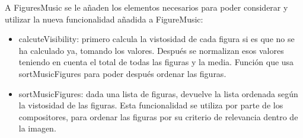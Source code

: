 A FiguresMusic se le añaden los elementos necesarios para poder considerar y utilizar la nueva funcionalidad añadida a FigureMusic:

\begin{itemize}

	\item{calcuteVisibility}: primero calcula la vistosidad de cada figura si es que no se ha calculado ya, tomando los valores. Después se normalizan esos valores teniendo en cuenta el total de todas las figuras y la media. Función que usa sortMusicFigures para poder después ordenar las figuras.

	\item{sortMusicFigures}: dada una lista de figuras, devuelve la lista ordenada según la vistosidad de las figuras. Esta funcionalidad se utiliza por parte de los compositores, para ordenar las figuras por su criterio de relevancia dentro de la imagen.

\end{itemize}